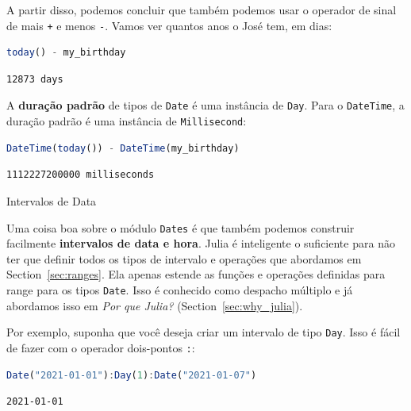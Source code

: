 \documentclass[
  notoc %
]{tufte-book}
\makeatletter
\newcommand{\passthrough}[1]{#1}
\renewcommand\subsubsection{%
\@startsection{subsubsection}{3}{\z@ }{-3.25ex\@plus -1ex \@minus -.2ex}{1.5ex \@plus .2ex}{\normalfont \normalsize \bfseries }
}
\makeatother
\begin{document}
A partir disso, podemos concluir que também podemos usar o operador de
sinal de mais \passthrough{\lstinline!+!} e menos
\passthrough{\lstinline!-!}. Vamos ver quantos anos o José tem, em dias:

\begin{lstlisting}[language=Julia]
today() - my_birthday
\end{lstlisting}

\begin{lstlisting}[language=Output]
12873 days
\end{lstlisting}

A \textbf{duração padrão} de tipos de \passthrough{\lstinline!Date!} é
uma instância de \passthrough{\lstinline!Day!}. Para o
\passthrough{\lstinline!DateTime!}, a duração padrão é uma instância de
\passthrough{\lstinline!Millisecond!}:

\begin{lstlisting}[language=Julia]
DateTime(today()) - DateTime(my_birthday)
\end{lstlisting}

\begin{lstlisting}[language=Output]
1112227200000 milliseconds
\end{lstlisting}

\hypertarget{sec:dates_intervals}{%
\subsubsection{Intervalos de Data}\label{sec:dates_intervals}}

Uma coisa boa sobre o módulo \passthrough{\lstinline!Dates!} é que
também podemos construir facilmente \textbf{intervalos de data e hora}.
Julia é inteligente o suficiente para não ter que definir todos os tipos
de intervalo e operações que abordamos em Section~\ref{sec:ranges}. Ela
apenas estende as funções e operações definidas para range para os tipos
\passthrough{\lstinline!Date!}. Isso é conhecido como despacho múltiplo
e já abordamos isso em \emph{Por que Julia?}
(Section~\ref{sec:why_julia}).

Por exemplo, suponha que você deseja criar um intervalo de tipo
\passthrough{\lstinline!Day!}. Isso é fácil de fazer com o operador
dois-pontos \passthrough{\lstinline!:!}:

\begin{lstlisting}[language=Julia]
Date("2021-01-01"):Day(1):Date("2021-01-07")
\end{lstlisting}

\begin{lstlisting}[language=Output]
2021-01-01
\end{lstlisting}
\end{document}
